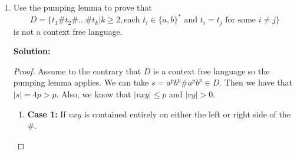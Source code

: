 \documentclass[11pt]{article}
\begin{document}
\begin{enumerate}
\begin{enumerate}
\begin{proof}
\begin{enumerate}
\item\textbf{Case 3: } The third case covers scenarios where $vxy$ is made up of a combination of $0s$ and $1s$.  We can further split this into two cases:
\begin{enumerate}
\item\textbf{Subcase 3a: } $vxy$ is made up of $0s$ followed by $1s$

In this case, either $vxy$ straddles the first partition of $0s$ and $1's$ or the second partition.  Because $|vxy| \leq p$ then by ``pumping" up or down the lengths of the substrings of $0s$ and $1s$ immediately next to $vxy$ will be changed but not the other substring.  If we fix $i = 2$, then $uv^2xy^2z$ would give us a string like $0^{p'}1^{p'}0^p1^p$ or $0^p1^p0^{p'}1^{p'}$, where $p' \neq p$.  This is a contradiction to our assumption because these strings are not elements of $A$.  

\item\textbf{Subcase 3b: } $vxy$ is made up of $1s$ followed by $0s$

The same argument can be made for the case where a string is made up of $1s$ followed by $0s$.  Again, let's fix $i = 2$, then $uv^2xy^2z$ gives us a string that looks like $0^p1^{p'}0^{p'}1^p$ which is clearly not in $A$ because $p' \neq p$.  Again, we have a contradiction.  
\end{enumerate}

So, because we have shown that we reach a contradiction in every possible permutation of $s$, we have proven that $A$ is not a context free language.  
\end{enumerate}
\end{proof}

\newpage
\item

Use the pumping lemma to prove that 
$$D = \{ t_1\#t_2\#\ldots\#t_k|k \geq 2, \text{each } t_i \in \{ a,b \}^* \text{ and } t_i = t_j \text{ for some } i \neq j \}$$
is not a context free language.  

\textbf{Solution: }
\begin{proof}

Assume to the contrary that $D$ is a context free language so the pumping lemma applies.  We can take $s = a^pb^p\#a^pb^p \in D$.  Then we have that $|s| = 4p > p$.  Also, we know that $|vxy| \leq p$ and $|vy| > 0$.  

\begin{enumerate}
\item\textbf{Case 1: } If $vxy$ is contained entirely on either the left or right side of the $\#$.  


\end{enumerate}
\end{proof}
\end{enumerate}
\end{enumerate}
\end{document}
